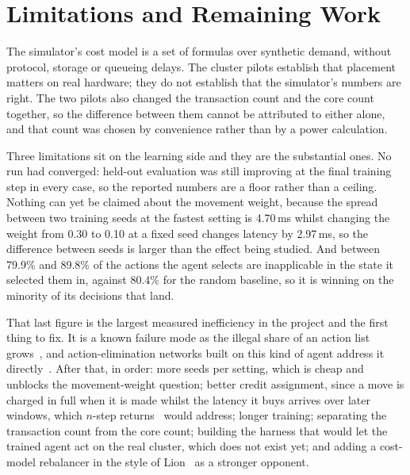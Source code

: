 \section{Limitations and Remaining Work}

The simulator's cost model is a set of formulas over synthetic demand, without
protocol, storage or queueing delays. The cluster pilots establish that
placement matters on real hardware; they do not establish that the simulator's
numbers are right. The two pilots also changed the transaction count and the
core count together, so the difference between them cannot be attributed to
either alone, and that count was chosen by convenience rather than by a power
calculation.

Three limitations sit on the learning side and they are the substantial ones.
No run had converged: held-out evaluation was still improving at the final
training step in every case, so the reported numbers are a floor rather than a
ceiling. Nothing can yet be claimed about the movement weight, because the
spread between two training seeds at the fastest setting is 4.70\,ms whilst
changing the weight from 0.30 to 0.10 at a fixed seed changes latency by
2.97\,ms, so the difference between seeds is larger than the effect being
studied. And between 79.9\% and 89.8\% of the actions the agent selects are
inapplicable in the state it selected them in, against 80.4\% for the random
baseline, so it is winning on the minority of its decisions that land.

That last figure is the largest measured inefficiency in the project and the
first thing to fix. It is a known failure mode as the illegal share of an
action list grows~\cite{huang2022masking}, and action-elimination networks
built on this kind of agent address it directly~\cite{zahavy2018elimination}.
After that, in order: more seeds per setting, which is cheap and unblocks the
movement-weight question; better credit assignment, since a move is charged in
full when it is made whilst the latency it buys arrives over later windows,
which $n$-step returns~\cite{hessel2018rainbow} would address; longer
training; separating the transaction count from the core count; building the
harness that would let the trained agent act on the real cluster, which does
not exist yet; and adding a cost-model rebalancer in the style of
Lion~\cite{lion2024} as a stronger opponent.
